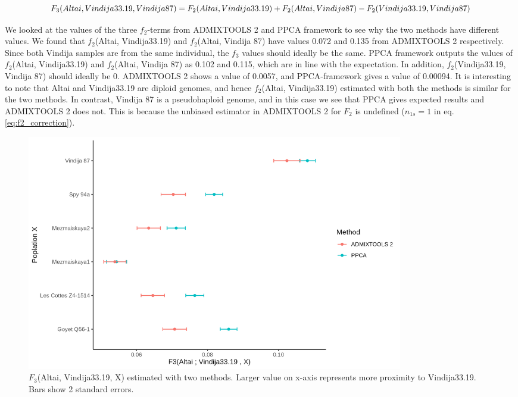 \documentclass[12pt, letterpaper]{article}
\begin{document}
\begin{dmath}
    F_3(Altai, Vindija33.19, Vindija 87) = F_2(Altai, Vindija33.19) + F_2(Altai, Vindija 87) - F_2(Vindija33.19, Vindija 87)\\
\end{dmath}


We looked at the values of the three $f_2$-terms from ADMIXTOOLS 2 and PPCA framework to see why the two methods have different values. We found that $f_2$(Altai, Vindija33.19) and $f_2$(Altai, Vindija 87) have values 0.072 and 0.135 from ADMIXTOOLS 2 respectively. Since both Vindija samples are from the same individual, the $f_3$ values should ideally be the same. PPCA framework outputs the values of $f_2$(Altai, Vindija33.19) and $f_2$(Altai, Vindija 87) as 0.102 and 0.115, which are in line with the expectation. In addition, $f_2$(Vindija33.19, Vindija 87) should ideally be 0. ADMIXTOOLS 2 shows a value of 0.0057, and PPCA-framework gives a value of 0.00094. It is interesting to note that Altai and Vindija33.19 are diploid genomes, and hence $f_2$(Altai, Vindija33.19) estimated with both the methods is similar for the two methods. In contrast, Vindija 87 is a pseudohaploid genome, and in this case we see that PPCA gives expected results and ADMIXTOOLS 2 does not. This is because the unbiased estimator in ADMIXTOOLS 2 for $F_2$ is undefined ($n_{1s}=1$ in eq. \ref{eq:f2_correction}). 

\begin{figure}[ht!]
    \includegraphics[width=16.5cm]{plots/f3_neandertal.png}
    \centering
    \caption{$F_3$(Altai, Vindija33.19, X) estimated with two methods. Larger value on x-axis represents more proximity to Vindija33.19. Bars show 2 standard errors.}
    \label{fig:nea_f3}
\end{figure}
\end{document}

